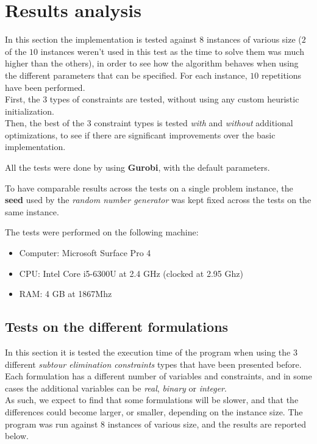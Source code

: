 \documentclass[
12pt,
a4paper,
oneside,
headinclude,
footinclude]{article}
\begin{document}
    \newpage 
    \section{Results analysis}
    In this section the implementation is tested against $8$ instances of various size ($2$ of the $10$ instances weren't used in this test as the time to solve them was much higher than the others), in order to see how the algorithm behaves when using the different parameters that can be specified. For each instance, $10$ repetitions have been performed. \\
    First, the $3$ types of constraints are tested, without using any custom heuristic initialization. \\
    Then, the best of the $3$ constraint types is tested \textit{with} and \textit{without} additional optimizations, to see if there are significant improvements over the basic implementation.
    
    All the tests were done by using \textbf{Gurobi}, with the default parameters.
    
    To have comparable results across the tests on a single problem instance, the \textbf{seed} used by the \textit{random number generator} was kept fixed across the tests on the same instance.
    
    The tests were performed on the following machine:
    \begin{itemize}
        \item Computer: Microsoft Surface Pro 4
        \item CPU: Intel Core i5-6300U at 2.4 GHz (clocked at 2.95 Ghz)
        \item RAM: 4 GB at 1867Mhz
    \end{itemize}

    \subsection{Tests on the different formulations}
    In this section it is tested the execution time of the program when using the $3$ different \textit{subtour elimination constraints} types that have been presented before.\\
    Each formulation has a different number of variables and constraints, and in some cases the additional variables can be \textit{real}, \textit{binary} or \textit{integer}.\\
    As such, we expect to find that some formulations will be slower, and that the differences could become larger, or smaller, depending on the instance size.
    The program was run against $8$ instances of various size, and the results are reported below.
    
\end{document}
